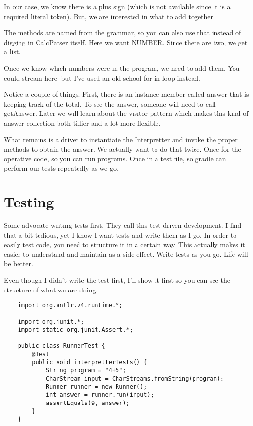 In our case, we know there is a plus sign (which is not available
since it is a required literal token). But, we are interested in
what to add together.

The methods are named from the grammar, so you can also use that
instead of digging in CalcParser itself. Here we want NUMBER.
Since there are two, we get a list.

Once we know which numbers were in the program, we need to add them.
You could stream here, but I've used an old school for-in loop instead.

Notice a couple of things. First, there is an instance member called
answer that is keeping track of the total. To see the answer, someone
will need to call getAnswer. Later we will learn about the visitor
pattern which makes this kind of answer collection both tidier and
a lot more flexible.

What remains is a driver to instantiate the Interpretter and invoke
the proper methods to obtain the answer. We actually want to do that
twice. Once for the operative code, so you can run programs. Once
in a test file, so gradle can perform our tests repeatedly as we go.

\section{Testing}

Some advocate writing tests first. They call this test driven development.
I find that a bit tedious, yet I know I want tests and write them as I
go. In order to easily test code, you need to structure it in a certain
way. This actually makes it easier to understand and maintain as a side
effect. Write tests as you go. Life will be better.

Even though I didn't write the test first, I'll show it first so you
can see the structure of what we are doing.

{\footnotesize
\begin{verbatim}
    import org.antlr.v4.runtime.*;
    
    import org.junit.*;
    import static org.junit.Assert.*;
    
    public class RunnerTest {
        @Test
        public void interpretterTests() {
            String program = "4+5";
            CharStream input = CharStreams.fromString(program);
            Runner runner = new Runner();
            int answer = runner.run(input);
            assertEquals(9, answer);
        }
    }
\end{verbatim}
}

